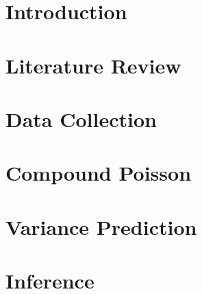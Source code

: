 \documentclass[12pt, a4paper]{memoir}
\begin{document}
\chapter{Introduction}


\chapter{Literature Review}


\chapter{Data Collection}

\chapter{Compound Poisson}


\chapter{Variance Prediction}


\chapter{Inference}





\end{document}
